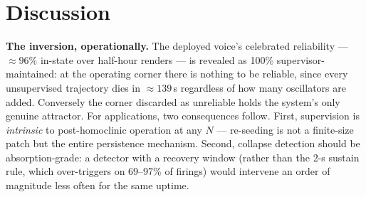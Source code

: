 \documentclass[pdflatex,sn-mathphys,Numbered]{sn-jnl}
\begin{document}
\section{Discussion}\label{sec:discussion}

\textbf{The inversion, operationally.} The deployed voice's celebrated reliability
--- $\approx 96\%$ in-state over half-hour renders --- is revealed as 100\%
supervisor-maintained: at the operating corner there is nothing to be reliable,
since every unsupervised trajectory dies in $\approx 139$\,s regardless of how many
oscillators are added. Conversely the corner discarded as unreliable holds the
system's only genuine attractor. For applications, two consequences follow. First,
supervision is \emph{intrinsic} to post-homoclinic operation at any $N$ ---
re-seeding is not a finite-size patch but the entire persistence mechanism. Second,
collapse detection should be absorption-grade: a detector with a recovery window
(rather than the 2-s sustain rule, which over-triggers on 69--97\% of firings)
would intervene an order of magnitude less often for the same uptime.
\end{document}
